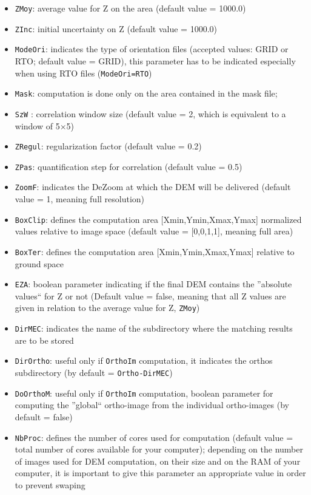 \begin{itemize}
  \item {\tt ZMoy}: average value for Z on the area (default value = 1000.0)
  \item {\tt ZInc}: initial uncertainty on Z (default value = 1000.0)
  \item {\tt ModeOri}: indicates the type of orientation files (accepted values: GRID or RTO; default value = GRID), this parameter has to be indicated especially when using RTO files ({\tt ModeOri=RTO})
  \item {\tt Mask}: computation is done only on the area contained in the mask file;
  \item {\tt SzW} : correlation window size (default value = 2, which is equivalent to a window of 5$\times$5)
  \item {\tt ZRegul}: regularization factor (default value = 0.2)
  \item {\tt ZPas}: quantification step for correlation (default value = 0.5)
  \item {\tt ZoomF}: indicates the DeZoom at which the DEM will be delivered (default value = 1, meaning full resolution)
  \item {\tt BoxClip}: defines the computation area [Xmin,Ymin,Xmax,Ymax] normalized values relative to image space (default value = [0,0,1,1], meaning full area)
  \item {\tt BoxTer}: defines the computation area [Xmin,Ymin,Xmax,Ymax] relative to ground space
  \item {\tt EZA}: boolean parameter indicating if the final DEM contains the ''absolute values`` for Z or not (Default value = false, meaning that all Z values are given in relation to the average value for Z, {\tt ZMoy})
  \item {\tt DirMEC}: indicates the name of the subdirectory where the matching results are to be stored
  \item {\tt DirOrtho}: useful only if {\tt OrthoIm} computation, it indicates the orthos subdirectory (by default = {\tt Ortho-{DirMEC}})
  \item {\tt DoOrthoM}: useful only if {\tt OrthoIm} computation, boolean parameter for computing the ''global`` ortho-image from the individual ortho-images (by default = false)
  \item {\tt NbProc}: defines the number of cores used for computation (default value = total number of cores available for your computer); depending on the number of images used for DEM computation, on their size and on the RAM of your computer, it is important to give this parameter an appropriate value in order to prevent swaping
\end{itemize}

